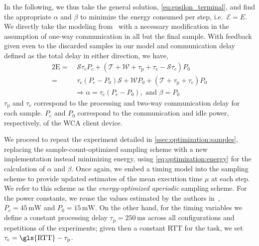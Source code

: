 In the following, we thus take the general solution, \cref{eq:epsilon_terminal}, and find the appropriate \( \alpha \) and \( \beta \) to minimize the energy consumed per step, i.e.\ \( \mathcal{E}=E \).
We directly take the modeling from~\cite{moothedath2022energy2} with a necessary modification in the  assumption of one-way communication in all but the final sample.
With feedback given even to the discarded samples in our model and communication delay defined as the total delay in either direction, we have, 
\begin{alignat}{2}
    \mathrm{E}=&\;\mathcal{S}\tau_cP_c+(\mathcal{T}+\mathcal{W}+\tau_\mathrm{p}+\tau_\mathrm{c}-\mathcal{S}\tau_c)P_0\nonumber\\
    =&\;\tau_{\text{c}}(P_{\text{c}} -P_0)\mathcal{S}+\mathcal{W}P_0+(\mathcal{T}+\tau_{\text{p}} +\tau_{\text{c}}) P_0\nonumber\\
&\Rightarrow \alpha=\tau_{\text{c}}(P_{\text{c}} -P_0),\text{ and }\beta=P_0 \label{eq:optimization:energy}
\end{alignat}
\( \tau_\text{p} \) and \( \tau_\text{c} \) correspond to the processing and two-way communication delay for each sample.
\( P_\text{c} \) and \( P_0 \) correspond to the communication and idle power, respectively, of the \gls{WCA} client device.

We proceed to repeat the experiment detailed in \cref{ssec:optimization:samples}, replacing the sample-count-optimized sampling scheme with a new implementation instead minimizing energy, using \cref{eq:optimization:energy} for the calculation of \( \alpha \) and \( \beta \).
Once again, we embed a timing model into the sampling scheme to provide updated estimates of the mean execution time \( \mu \) at each step.
We refer to this scheme as the \emph{energy-optimized aperiodic} sampling scheme.
For the power constants, we reuse the values estimated by the authors in~\cite{moothedath2022energy1}, \( P_\text{c} = 45\,\si{\milli\watt} \) and \( P_\text{0} = 15\,\si{\milli\watt} \).
On the other hand, for the timing variables we define a constant processing delay \( \tau_\text{p} = 250\,\si{\milli\second} \) across all configurations and repetitions of the experiments; given then a constant \gls{RTT} for the task, we set \( \tau_\text{c} = \text{\gls{RTT}} - \tau_\text{p} \).

